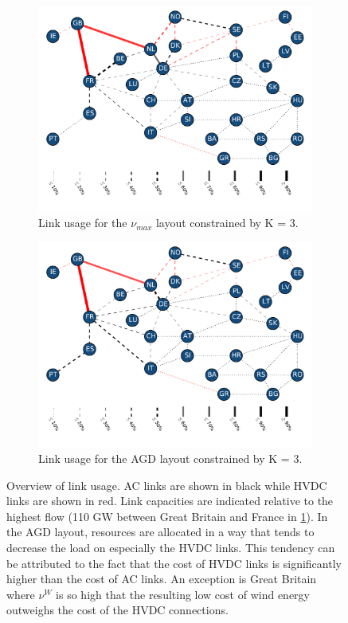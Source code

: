 \documentclass[a4paper, 5p, sort&compress]{elsarticle}%
\begin{document}
 \begin{figure}[p]
   \centering
   \begin{subfigure}{2\columnwidth}
     \includegraphics[width = 0.75 \columnwidth, center]{cfMaxK=3LINKS}
     \caption{Link usage for the $\nu_{max}$ layout constrained by K = 3.}
     \label{fig:linksCfMax}    
   \end{subfigure}
   \begin{subfigure}{2\columnwidth}
     \includegraphics[width = 0.75 \columnwidth, center]{seqK=3localizedLINKS}
     \caption{Link usage for the AGD layout constrained by K = 3.}
     \label{fig:linksTransAgd}    
   \end{subfigure}
   \caption{Overview of link usage. AC links are shown in black while
     HVDC links are shown in red. Link capacities are indicated
     relative to the highest flow (110 GW between Great Britain and
     France in \cref{fig:linksCfMax}). In the AGD layout, resources
     are allocated in a way that tends to decrease the load on
     especially the HVDC links. This tendency can be attributed to the
     fact that the cost of HVDC links is significantly higher than the
     cost of AC links. An exception is Great Britain where $\nu^{W}$ is
     so high that the resulting low cost of wind energy outweighs the
     cost of the HVDC connections.}
   \label{fig:links}
 \end{figure}
\end{document}
